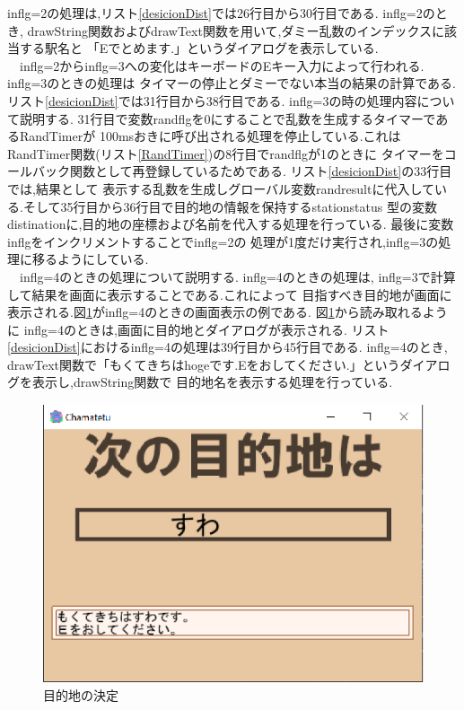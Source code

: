 \documentclass[a4j]{jarticle}
\begin{document}
            inflg=2の処理は,リスト\ref{desicionDist}では26行目から30行目である. inflg=2のとき,
            drawString関数およびdrawText関数を用いて,ダミー乱数のインデックスに該当する駅名と
            「Eでとめます.」というダイアログを表示している.\\
            　inflg=2からinflg=3への変化はキーボードのEキー入力によって行われる. inflg=3のときの処理は
            タイマーの停止とダミーでない本当の結果の計算である. リスト\ref{desicionDist}では31行目から38行目である.
            inflg=3の時の処理内容について説明する. 31行目で変数randflgを0にすることで乱数を生成するタイマーであるRandTimerが
            100msおきに呼び出される処理を停止している.これはRandTimer関数(リスト\ref{RandTimer})の8行目でrandflgが1のときに
            タイマーをコールバック関数として再登録しているためである. リスト\ref{desicionDist}の33行目では,結果として
            表示する乱数を生成しグローバル変数randresultに代入している.そして35行目から36行目で目的地の情報を保持するstationstatus
            型の変数distinationに,目的地の座標および名前を代入する処理を行っている. 最後に変数inflgをインクリメントすることでinflg=2の
            処理が1度だけ実行され,inflg=3の処理に移るようにしている.\\
            　inflg=4のときの処理について説明する. inflg=4のときの処理は, inflg=3で計算して結果を画面に表示することである.これによって
            目指すべき目的地が画面に表示される.図\ref{distflg4}がinflg=4のときの画面表示の例である. 図\ref{distflg4}から読み取れるように
            inflg=4のときは,画面に目的地とダイアログが表示される. リスト\ref{desicionDist}におけるinflg=4の処理は39行目から45行目である.
            inflg=4のとき, drawText関数で「もくてきちはhogeです.Eをおしてください.」というダイアログを表示し,drawString関数で
            目的地名を表示する処理を行っている.

            \begin{figure}[H]
                \centering
                \includegraphics[scale=1.3]{distflg4.eps}
                \caption{目的地の決定}
                 \label{distflg4}
                \end{figure} 
\end{document}
